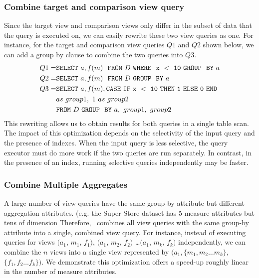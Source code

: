 \subsubsection{Combine target and comparison view query}
\label{subsec:target_comparison_view}
Since the target view and comparison views only differ in the subset of data
that the query is executed on, we can easily rewrite these two view queries as
one. For instance, for the target and comparison view queries $Q1$ and $Q2$
shown below, we can add a group by clause to combine the two queries into $Q3$.
\begin{align*} 
Q1 = &{\tt SELECT \ } a, f(m) \ \ {\tt FROM} \  D\  {\tt WHERE \ \ x\ <\ 10\
GROUP \ \ BY} \ a \\
Q2 = &{\tt SELECT \ } a, f(m) \ \ {\tt FROM} \  D\  {\tt GROUP \ \ BY} \ a \\
Q3 = &{\tt SELECT \ } a, f(m), {\tt CASE\ IF\ x\ <\ 10\ THEN\ 1\ ELSE\ 0\
END}\\ 
&as\ group1,\ 1\ as\ group2\\ 
&{\tt FROM} \ D\ {\tt GROUP \ \ BY} \ a,\ group1,\ group2
\end{align*}
This rewriting allows us to obtain results for both queries in a single table
scan. The impact of this optimization depends on the selectivity of the
input query and the presence of indexes. When the input query is less selective,
the query executor must do more work if the two queries are run separately. In
contrast, in the presence of an index, running selective queries independently
may be faster.

\subsubsection {Combine Multiple Aggregates} 
A large number of view queries have the same group-by attribute but different
aggregation attributes. 
(e.g. the Super Store dataset has 5 measure attributes but tens of dimension
Therefore, \SeeDB\ combines all view queries with the same
group-by attribute into a single, combined view query. For instance, instead of executing
queries for views $(a_1$, $m_1$, $f_1)$, $(a_1$, $m_2$, $f_2)$ \ldots $(a_1$, $m_k$, $f_k)$
independently, we can combine the $n$ views into a single view represented by
$(a_1, \{m_1, m_2\ldots m_k\}$, $\{f_1, f_2\ldots f_k\})$. We demonstrate this
optimization offers a speed-up roughly linear in the number of measure
attributes.

